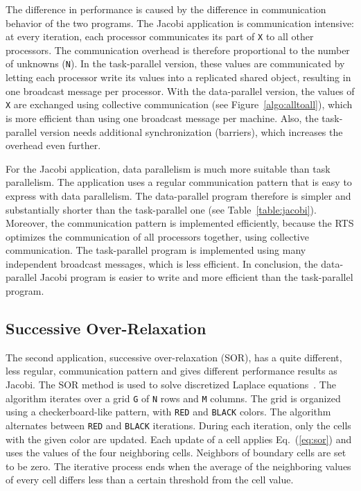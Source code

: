 \documentclass{acmtrans2e}
\begin{document}
The difference in performance is caused by the difference in
communication behavior of the two programs.
The Jacobi application is communication intensive: at every
iteration, each processor communicates its part of \verb+X+ to all
other processors. The communication overhead is therefore
proportional to the number of unknowns (\verb+N+).
In the task-parallel version, these values are communicated by letting
each processor write its values into a replicated shared object, resulting
in one broadcast message per processor.
With the data-parallel version, the values of \verb+X+ are exchanged using
collective communication (see Figure~\ref{algo:alltoall}), which is
more efficient than using one broadcast message per machine.
Also, the task-parallel version needs additional synchronization (barriers),
which increases the overhead even further.

For the Jacobi application, data parallelism is much more suitable
than task parallelism. The application uses a regular communication pattern
that is easy to express with data parallelism. The data-parallel program
therefore is simpler and substantially shorter
than the task-parallel one (see Table~\ref{table:jacobi}).
Moreover, the communication pattern is implemented efficiently,
because the RTS optimizes the communication of all processors together, using
collective communication. The task-parallel program is implemented using
many independent broadcast messages, which is less efficient.
In conclusion, the data-parallel Jacobi program is easier to write
and more efficient than the task-parallel program.

\subsection{Successive Over-Relaxation}
\label{sec:sor}

The second application, successive over-relaxation (SOR), has a quite different,
less regular, communication pattern and
gives different performance results as Jacobi.
The SOR method is used to solve discretized Laplace
equations~\cite{stoer83}. The algorithm iterates over a grid \verb+G+
of \verb+N+ rows and \verb+M+ columns. The grid is organized using a
checkerboard-like pattern, with \verb+RED+ and \verb+BLACK+
colors. The algorithm alternates between \verb+RED+ and \verb+BLACK+
iterations.
During each iteration, only the cells with the given color are updated.
Each update of a cell applies
Eq.~(\ref{eq:sor}) and uses the values of the four neighboring
cells. Neighbors of boundary cells are set to be zero. The iterative
process ends when the average of the neighboring values of every cell
differs less than a certain threshold from the cell value.
\end{document}
